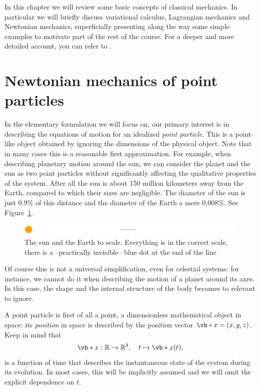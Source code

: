 \documentclass[english,fontsize=11pt,paper=b5]{scrbook}
\numberwithin{equation}{chapter}
\theoremstyle{definition}
\newcommand{\emphidx}[1]{\index{#1}\emph{#1}}
\begin{document}
  In this chapter we will review some basic concepts of classical mechanics.
  In particular we will briefly discuss variational calculus, Lagrangian mechanics and Newtonian mechanics, superficially presenting along the way some simple examples to motivate part of the rest of the course.
  For a deeper and more detailed account, you can refer to \cite{book:arnold,book:knauf}.

  \section{Newtonian mechanics of point particles}

  In the elementary formulation we will focus on, our primary interest is in describing the equations of motion for an idealized \emphidx{point particle}.
  This is a point--like object obtained by ignoring the dimensions of the physical object.
  Note that in many cases this is a reasonable first approximation.
  For example, when describing planetary motion around the sun, we can consider the planet and the sun as two point particles without significantly affecting the qualitative properties of the system.
  After all the sun is about 150 million kilometers away from the Earth, compared to which their sizes are negligible.
  The diameter of the sun is just 0.9\% of this distance and the diameter of the Earth a mere 0,008\%. See Figure~\ref{fig:sun-earth-scale}.
  \begin{figure}
    \centering
    \includegraphics[width=.9\linewidth]{images/sun-earth-scale.pdf}
    \caption{The sun and the Earth to scale. Everything is in the correct scale, there is a --practically invisible-- blue dot at the end of the line}\label{fig:sun-earth-scale}%
  \end{figure}
  Of course this is not a universal simplification, even for celestial systems: for instance, we cannot do it when describing the motion of a planet around its axes.
  In this case, the shape and the internal structure of the body becomes to relevant to ignore.

   A point particle is first of all a point, a dimensionless mathematical object in space: its \emphidx{position} in space is described by the position vector $\vb*{x} = (x, y ,z)$.
   Keep in mind that
  \begin{equation}
    \vb*{x} : \mathbb{R}\to\mathbb{R}^3,\quad t \mapsto \vb*{x}(t),
  \end{equation}
  is a function of time that describes the instantaneous state of the system during its evolution.
  In most cases, this will be implicitly assumed and we will omit the explicit dependence on $t$.
\end{document}
